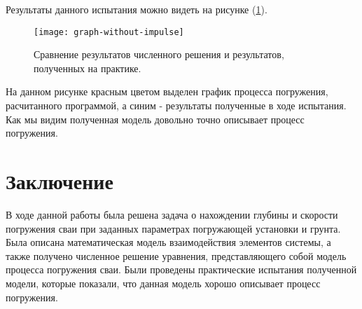 \noindent Результаты данного испытания можно видеть на рисунке (\ref{fig:graph-without-impulse}).

\begin{figure}[ht]
    \centering
    \texttt{[image: graph-without-impulse]}
    \caption{Сравнение результатов численного решения и результатов, полученных на практике.}
    \label{fig:graph-without-impulse}
\end{figure}

На данном рисунке красным цветом выделен график процесса погружения, расчитанного программой, а синим - результаты
полученные в ходе испытания. Как мы видим полученная модель довольно точно описывает процесс погружения.

\clearpage

\section*{Заключение}

В ходе данной работы была решена задача о нахождении глубины и скорости погружения сваи при заданных параметрах погружающей
установки и грунта. Была описана математическая модель взаимодействия элементов системы, а также получено численное решение
уравнения, представляющего собой модель процесса погружения сваи. Были проведены практические испытания полученной модели,
которые показали, что данная модель хорошо описывает процесс погружения.

\clearpage


\nocite{*}

\printbibliography{}
